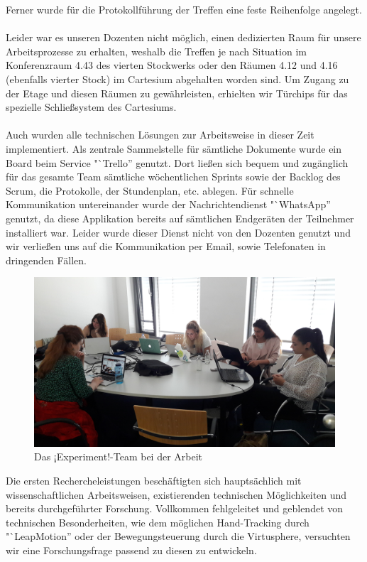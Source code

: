 \documentclass{Bericht}
\begin{document}
		Ferner wurde für die Protokollführung der Treffen eine feste Reihenfolge angelegt.\\
\\
		Leider war es unseren Dozenten nicht möglich, einen dedizierten Raum für unsere Arbeitsprozesse zu erhalten, weshalb die Treffen je nach Situation im Konferenzraum 4.43 des vierten Stockwerks oder den Räumen 4.12 und 4.16 (ebenfalls vierter Stock) im Cartesium abgehalten worden sind. Um Zugang zu der Etage und diesen Räumen zu gewährleisten, erhielten wir Türchips für das spezielle Schließsystem des Cartesiums.\\
\\
\newpage
		Auch wurden alle technischen Lösungen zur Arbeitsweise in dieser Zeit implementiert. Als zentrale Sammelstelle für sämtliche Dokumente wurde ein Board beim Service "`Trello'' genutzt. Dort ließen sich bequem und zugänglich für das gesamte Team sämtliche wöchentlichen Sprints sowie der Backlog des Scrum, die Protokolle, der Stundenplan, etc. ablegen. Für schnelle Kommunikation untereinander wurde der Nachrichtendienst "`WhatsApp'' genutzt, da diese Applikation bereits auf sämtlichen Endgeräten der Teilnehmer installiert war. Leider wurde dieser Dienst nicht von den Dozenten genutzt und wir verließen uns auf die Kommunikation per Email, sowie Telefonaten in dringenden Fällen.\\
		\begin{figure}[H] %
			\centering
			\includegraphics[width=\linewidth, height=\textheight, keepaspectratio]{../Bilder/20170518_103125.jpg}
			\caption{Das ¡Experiment!-Team bei der Arbeit}
			\label{img:experiment-team-bei-der-arbeit}
		\end{figure}
		Die ersten Rechercheleistungen beschäftigten sich hauptsächlich mit wissenschaftlichen Arbeitsweisen, existierenden technischen Möglichkeiten und bereits durchgeführter Forschung. Vollkommen fehlgeleitet und geblendet von technischen Besonderheiten, wie dem möglichen Hand-Tracking durch "`LeapMotion'' oder der Bewegungsteuerung durch die Virtusphere, versuchten wir eine Forschungsfrage passend zu diesen zu entwickeln.\\
\end{document}
